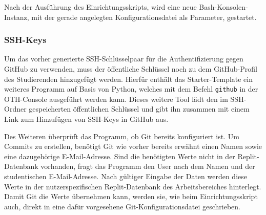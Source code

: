 Nach der Ausführung des Einrichtungsskripts, wird eine neue
Bash-Konsolen-Instanz, mit der gerade angelegten Konfigurationsdatei als
Parameter, gestartet.

\subsubsection{SSH-Keys}\label{replit-template-ssh-keys}
Um das vorher generierte SSH-Schlüsselpaar für die Authentifizierung gegen
GitHub zu verwenden, muss der öffentliche Schlüssel noch zu dem GitHub-Profil
des Studierenden hinzugefügt werden. Hierfür enthält das Starter-Template ein
weiteres Programm auf Basis von Python, welches mit dem Befehl \texttt{github}
in der OTH-Console ausgeführt werden kann. Dieses weitere Tool lädt den im
SSH-Ordner gespeicherten öffentlichen Schlüssel und gibt ihn zusammen mit einem
Link zum Hinzufügen von SSH-Keys in GitHub aus.

Des Weiteren überprüft das Programm, ob Git bereits konfiguriert ist. Um Commits
zu erstellen, benötigt Git wie vorher bereits erwähnt einen Namen sowie eine
dazugehörige E-Mail-Adresse. Sind die benötigten Werte nicht in der
Replit-Datenbank vorhanden, fragt das Programm den User nach dem Namen und der 
studentischen E-Mail-Adresse. Nach gültiger Eingabe der Daten werden diese Werte
in der nutzerspezifischen Replit-Datenbank des Arbeitsbereiches hinterlegt.
Damit Git die Werte übernehmen kann, werden sie, wie beim Einrichtungsskript
auch, direkt in eine dafür vorgesehene Git-Konfigurationsdatei geschrieben.